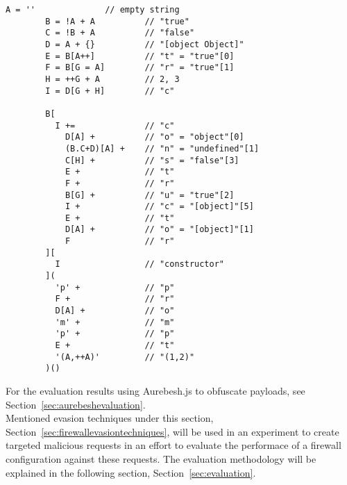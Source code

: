 \begin{lstlisting}[style=basicStyle, caption={Aurebesh.js obfuscation of prompt(1,2)}, label={lst:aurebeshprompt}]
		A = ''              // empty string
		B = !A + A          // "true"
		C = !B + A          // "false"
		D = A + {}          // "[object Object]"
		E = B[A++]          // "t" = "true"[0]
		F = B[G = A]        // "r" = "true"[1]
		H = ++G + A         // 2, 3
		I = D[G + H]        // "c"

		B[
		  I +=              // "c"
		    D[A] +          // "o" = "object"[0]
		    (B.C+D)[A] +    // "n" = "undefined"[1]
		    C[H] +          // "s" = "false"[3]
		    E +             // "t"
		    F +             // "r"
		    B[G] +          // "u" = "true"[2]
		    I +             // "c" = "[object]"[5]
		    E +             // "t"
		    D[A] +          // "o" = "[object]"[1]
		    F               // "r"
		][
		  I                 // "constructor"
		](
		  'p' +             // "p"
		  F +               // "r"
		  D[A] +            // "o"
		  'm' +             // "m"
		  'p' +             // "p"
		  E +               // "t"
		  '(A,++A)'         // "(1,2)"
		)()
\end{lstlisting}

For the evaluation results using Aurebesh.js to obfuscate payloads, see Section~\ref{sec:aurebeshevaluation}. \\

Mentioned evasion techniques under this section, Section~\ref{sec:firewallevasiontechniques}, will be used in an experiment to create targeted malicious requests in an effort to evaluate the performace of a firewall configuration against these requests. The evaluation methodology will be explained in the following section, Section~\ref{sec:evaluation}.
